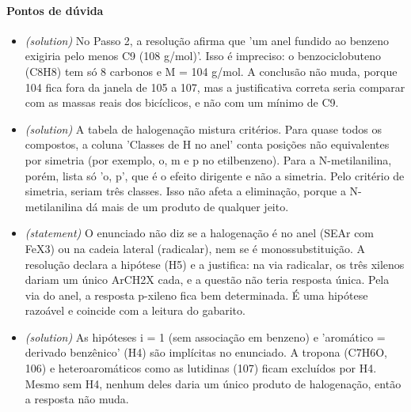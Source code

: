 \documentclass{article}%
\begin{document}
\paragraph{Pontos de dúvida}%
\begin{itemize}%
\item%
\textit{(solution)} No Passo 2, a resolução afirma que 'um anel fundido ao benzeno exigiria pelo menos C9 (108 g/mol)'. Isso é impreciso: o benzociclobuteno (C8H8) tem só 8 carbonos e M = 104 g/mol. A conclusão não muda, porque 104 fica fora da janela de 105 a 107, mas a justificativa correta seria comparar com as massas reais dos bicíclicos, e não com um mínimo de C9.%
\item%
\textit{(solution)} A tabela de halogenação mistura critérios. Para quase todos os compostos, a coluna 'Classes de H no anel' conta posições não equivalentes por simetria (por exemplo, o, m e p no etilbenzeno). Para a N{-}metilanilina, porém, lista só 'o, p', que é o efeito dirigente e não a simetria. Pelo critério de simetria, seriam três classes. Isso não afeta a eliminação, porque a N{-}metilanilina dá mais de um produto de qualquer jeito.%
\item%
\textit{(statement)} O enunciado não diz se a halogenação é no anel (SEAr com FeX3) ou na cadeia lateral (radicalar), nem se é monossubstituição. A resolução declara a hipótese (H5) e a justifica: na via radicalar, os três xilenos dariam um único ArCH2X cada, e a questão não teria resposta única. Pela via do anel, a resposta p{-}xileno fica bem determinada. É uma hipótese razoável e coincide com a leitura do gabarito.%
\item%
\textit{(solution)} As hipóteses i = 1 (sem associação em benzeno) e 'aromático = derivado benzênico' (H4) são implícitas no enunciado. A tropona (C7H6O, 106) e heteroaromáticos como as lutidinas (107) ficam excluídos por H4. Mesmo sem H4, nenhum deles daria um único produto de halogenação, então a resposta não muda.%
\end{itemize}%
\end{document}
